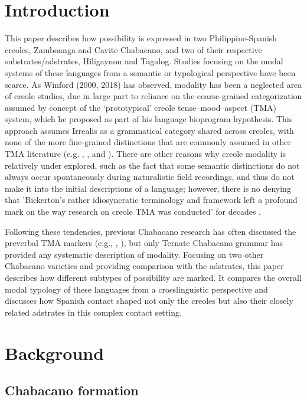 \documentclass[output=paper]{langsci/langscibook}
\begin{document}
\section{Introduction}

This paper describes how possibility is expressed in two Philippine-Spanish creoles, Zamboanga and Cavite Chabacano, and two of their respective substrates/adstrates, Hiligaynon and Tagalog. Studies focusing on the modal systems of these languages from a semantic or typological perspective have been scarce. As Winford (2000, 2018) has observed, modality has been a neglected area of creole studies, due in large part to reliance on the coarse-grained categorization assumed by  concept of the ‘prototypical’ creole tense–mood–aspect (TMA) system, which he proposed as part of his language bioprogram hypothesis. This approach assumes Irrealis as a grammatical category shared across creoles, with none of the more fine-grained distinctions that are commonly assumed in other TMA literature (e.g. \citealt{Dahl1985}, \citealt{BybeeEtAl1994}, and \citealt{Palmer2001}). There are other reasons why creole modality is relatively under explored, such as the fact that some semantic distinctions do not always occur spontaneously during naturalistic field recordings, and thus do not make it into the initial descriptions of a language; however, there is no denying that 'Bickerton’s rather idiosyncratic terminology and framework left a profound mark on the way research on creole TMA was conducted' for decades \citep[1]{Winford2018}. 

Following these tendencies, previous Chabacano research has often discussed the preverbal TMA markers (e.g., \citealt{Forman1972}, \citealt{LipskiSantoro2007}), but only  Ternate Chabacano grammar has provided any systematic description of modality. Focusing on two other Chabacano varieties and providing comparison with the adstrates, this paper describes how different subtypes of possibility are marked. It compares the overall modal typology of these languages from a crosslinguistic perspective and discusses how Spanish contact shaped not only the creoles but also their closely related adstrates in this complex contact setting. 

\section{Background}
\subsection{Chabacano formation}
\end{document}
